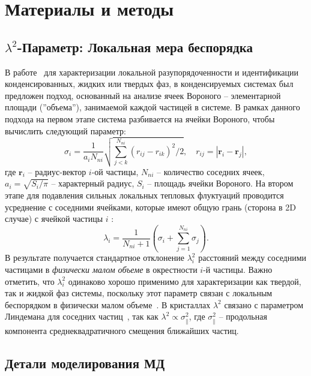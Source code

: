 \section{Материалы и методы}

\subsection{\texorpdfstring{$\lambda^2$}{lambda2}-Параметр: Локальная мера беспорядка}
\label{SSMF-AppA}

В работе~\cite{10.1021/acs.jpcc.7b09317} для характеризации локальной разупорядоченности и идентификации конденсированных, жидких или твердых фаз, в конденсируемых системах был предложен подход, основанный на анализе ячеек Вороного -- элементарной площади (''объема''), занимаемой каждой частицей в системе.
В рамках данного подхода на первом этапе система разбивается на ячейки Вороного, чтобы вычислить следующий параметр:
\begin{equation}
  \label{SSMF-eq1}
  \sigma_{i} =\frac{1}{a_i N_{ni}}\sqrt{\sum_{j<k}^{N_{ni}}{(r_{ij}-r_{ik})^2}/2}, \quad r_{ij}=|\mathbf{r}_i-\mathbf{r}_j|,
\end{equation}
где $\mathbf{r}_i$ -- радиус-вектор $i$-ой частицы, $N_{ni}$ -- количество соседних ячеек, $a_i = \sqrt{S_i/\pi}$ -- характерный радиус, $S_i$ -- площадь ячейки Вороного.
На втором этапе для подавления сильных локальных тепловых флуктуаций проводится усреднение с соседними ячейками, которые имеют общую грань (сторона в 2D случае) с ячейкой частицы $i$ \cite{10.1021/acs.jpcc.7b09317}:
\begin{equation}
  \label{SSMF-eq2}
  \lambda_{i} = \frac{1}{N_{ni}+1}\left(\sigma_{i}+\sum_{j=1}^{N_{ni}}{\sigma_{j}}\right).
\end{equation}
В результате получается стандартное отклонение $\lambda_i^2$ расстояний между соседними частицами в \emph{физически малом объеме} в окрестности $i$-й частицы.
Важно отметить, что $\lambda_i^2$ одинаково хорошо применимо для характеризации как твердой, так и жидкой фаз системы, поскольку этот параметр связан с локальным беспорядком в физически малом объеме~\cite{10.1021/acs.jpcc.7b09317}.
В кристаллах $\lambda^2$ связано с параметром Линдемана для соседних частиц~\cite{10.1016/0375-9601(85)90617-6}, так как $\lambda^2 \propto \sigma_\|^2$, где $\sigma_\|^2$ -- продольная компонента среднеквадратичного смещения ближайших частиц.


\subsection{Детали моделирования МД}
\label{SSMF-AppC}


